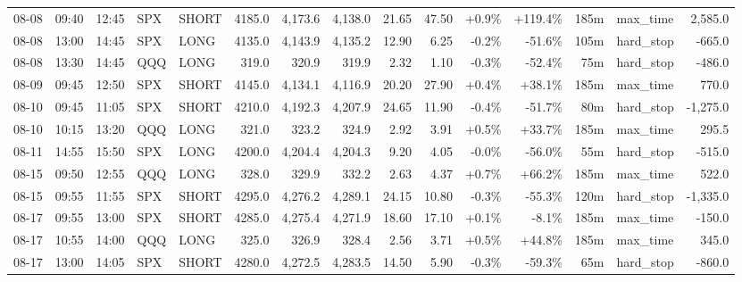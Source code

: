 \documentclass[11pt,a4paper,twoside]{article}
\begin{document}
\begin{landscape}
\begin{center}
\begin{longtable}{>{\color{txtmain}}l l l l l r r r r r r r r >{\color{txtmain}}l r}
08-08 & 09:40 & 12:45 & SPX & SHORT & 4185.0 & 4,173.6 & 4,138.0 & 21.65 & 47.50 & \textcolor{wingreen}{+0.9\%} & \textcolor{wingreen}{+119.4\%} & 185m & max\_time & \textcolor{wingreen}{2,585.0} \\
08-08 & 13:00 & 14:45 & SPX & LONG & 4135.0 & 4,143.9 & 4,135.2 & 12.90 & 6.25 & \textcolor{lossred}{-0.2\%} & \textcolor{lossred}{-51.6\%} & 105m & hard\_stop & \textcolor{lossred}{-665.0} \\
08-08 & 13:30 & 14:45 & QQQ & LONG & 319.0 & 320.9 & 319.9 & 2.32 & 1.10 & \textcolor{lossred}{-0.3\%} & \textcolor{lossred}{-52.4\%} & 75m & hard\_stop & \textcolor{lossred}{-486.0} \\
08-09 & 09:45 & 12:50 & SPX & SHORT & 4145.0 & 4,134.1 & 4,116.9 & 20.20 & 27.90 & \textcolor{wingreen}{+0.4\%} & \textcolor{wingreen}{+38.1\%} & 185m & max\_time & \textcolor{wingreen}{770.0} \\
08-10 & 09:45 & 11:05 & SPX & SHORT & 4210.0 & 4,192.3 & 4,207.9 & 24.65 & 11.90 & \textcolor{lossred}{-0.4\%} & \textcolor{lossred}{-51.7\%} & 80m & hard\_stop & \textcolor{lossred}{-1,275.0} \\
08-10 & 10:15 & 13:20 & QQQ & LONG & 321.0 & 323.2 & 324.9 & 2.92 & 3.91 & \textcolor{wingreen}{+0.5\%} & \textcolor{wingreen}{+33.7\%} & 185m & max\_time & \textcolor{wingreen}{295.5} \\
08-11 & 14:55 & 15:50 & SPX & LONG & 4200.0 & 4,204.4 & 4,204.3 & 9.20 & 4.05 & \textcolor{lossred}{-0.0\%} & \textcolor{lossred}{-56.0\%} & 55m & hard\_stop & \textcolor{lossred}{-515.0} \\
08-15 & 09:50 & 12:55 & QQQ & LONG & 328.0 & 329.9 & 332.2 & 2.63 & 4.37 & \textcolor{wingreen}{+0.7\%} & \textcolor{wingreen}{+66.2\%} & 185m & max\_time & \textcolor{wingreen}{522.0} \\
08-15 & 09:55 & 11:55 & SPX & SHORT & 4295.0 & 4,276.2 & 4,289.1 & 24.15 & 10.80 & \textcolor{lossred}{-0.3\%} & \textcolor{lossred}{-55.3\%} & 120m & hard\_stop & \textcolor{lossred}{-1,335.0} \\
08-17 & 09:55 & 13:00 & SPX & SHORT & 4285.0 & 4,275.4 & 4,271.9 & 18.60 & 17.10 & \textcolor{wingreen}{+0.1\%} & \textcolor{lossred}{-8.1\%} & 185m & max\_time & \textcolor{lossred}{-150.0} \\
08-17 & 10:55 & 14:00 & QQQ & LONG & 325.0 & 326.9 & 328.4 & 2.56 & 3.71 & \textcolor{wingreen}{+0.5\%} & \textcolor{wingreen}{+44.8\%} & 185m & max\_time & \textcolor{wingreen}{345.0} \\
08-17 & 13:00 & 14:05 & SPX & SHORT & 4280.0 & 4,272.5 & 4,283.5 & 14.50 & 5.90 & \textcolor{lossred}{-0.3\%} & \textcolor{lossred}{-59.3\%} & 65m & hard\_stop & \textcolor{lossred}{-860.0} \\

\end{longtable}
\end{center}
\end{landscape}
\end{document}
